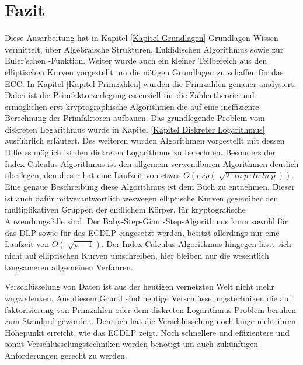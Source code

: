\section{Fazit}
	Diese Ausarbeitung hat in Kapitel \ref{Kapitel Grundlagen} Grundlagen Wissen vermittelt, über Algebraische Strukturen, Euklidischen Algorithmus sowie zur Euler’schen \myPhi -Funktion. Weiter wurde auch ein kleiner Teilbereich aus den elliptischen Kurven vorgestellt um die nötigen Grundlagen zu schaffen für das ECC. In Kapitel \ref{Kapitel Primzahlen} wurden die Primzahlen genauer analysiert. Dabei ist die Primfaktorzerlegung essenziell für die Zahlentheorie und ermöglichen erst kryptographische Algorithmen die auf eine ineffiziente Berechnung der Primfaktoren aufbauen. Das grundlegende Problem vom diskreten Logarithmus wurde in Kapitel \ref{Kapitel Diskreter Logarithmus} ausführlich erläutert. Des weiteren wurden Algorithmen vorgestellt mit dessen Hilfe es möglich ist den diskreten Logarithmus zu berechnen. Besonders der Index-Calculus-Algorithmus ist den allgemein verwendbaren Algorithmen deutlich überlegen, den dieser hat eine Laufzeit von etwas $O(exp(\sqrt[]{2 \cdot ln~p \cdot ln~ln~p}))$. Eine genaue Beschreibung diese Algorithmus ist dem Buch \cite{Einfuehrung:in:die:Kryptographie} zu entnehmen. Dieser ist auch dafür mitverantwortlich weswegen elliptische Kurven gegenüber den multiplikativen Gruppen der endlichem Körper, für kryptografische Anwendungsfälle  sind. Der Baby-Step-Giant-Step-Algorithmus kann sowohl für das DLP sowie für das ECDLP eingesetzt werden, besitzt allerdings nur eine Laufzeit von $O(\sqrt[]{p-1})$. Der Index-Calculus-Algorithmus hingegen lässt sich nicht auf elliptischen Kurven umschreiben, hier bleiben nur die wesentlich langsameren allgemeinen Verfahren.\cite{Mathematisch:fuer:fortgeschrittene:Anfaenger}
	
	Verschlüsselung von Daten ist aus der heutigen vernetzten Welt nicht mehr wegzudenken. Aus diesem Grund sind heutige Verschlüsselungstechniken die auf faktorisierung von Primzahlen oder dem diskreten Logarithmus Problem beruhen zum Standard geworden. Dennoch hat die Verschlüsselung noch lange nicht ihren Höhepunkt erreicht, wie das ECDLP zeigt. Noch schnellere und effizientere und somit  Verschlüsselungstechniken werden benötigt um auch zukünftigen Anforderungen gerecht zu werden.